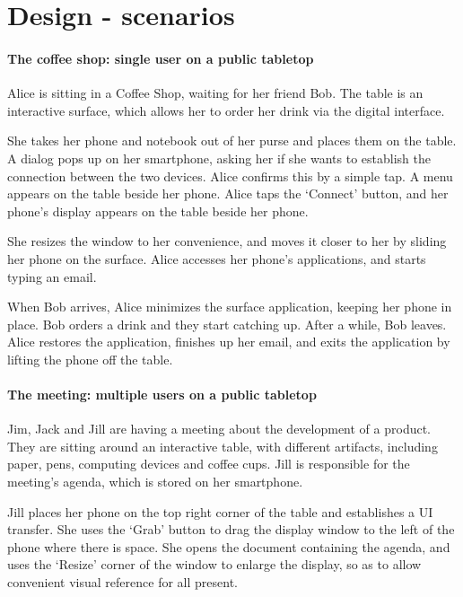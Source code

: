 \chapter{Design - scenarios}
\label{scenarios}

\subsubsection*{The coffee shop: single user on a public tabletop}

Alice is sitting in a Coffee Shop, waiting for her friend Bob.
The table is an interactive surface, which allows her to order her drink via the digital interface.

She takes her phone and notebook out of her purse and places them on the table. 
A dialog pops up on her smartphone, asking her if she wants to establish the connection between the two devices.
Alice confirms this by a simple tap.
A menu appears on the table beside her phone. 
Alice taps the `Connect' button, and her phone's display appears on the table beside her phone.

She resizes the window to her convenience, and moves it closer to her by sliding her phone on the surface. 
Alice accesses her phone's applications, and starts typing an email.

When Bob arrives, Alice minimizes the surface application, keeping her phone in place. 
Bob orders a drink and they start catching up. 
After a while, Bob leaves. 
Alice restores the application, finishes up her email, and exits the application by lifting the phone off the table.

\subsubsection*{The meeting: multiple users on a public tabletop}

Jim, Jack and Jill are having a meeting about the development of a product. 
They are sitting around an interactive table, with different artifacts, including paper, pens, computing devices and coffee cups. 
Jill is responsible for the meeting's agenda, which is stored on her smartphone.

Jill places her phone on the top right corner of the table and establishes a UI transfer. 
She uses the `Grab' button to drag the display window to the left of the phone where there is space. 
She opens the document containing the agenda, and uses the `Resize' corner of the window to enlarge the display, so as to allow convenient visual reference for all present.

